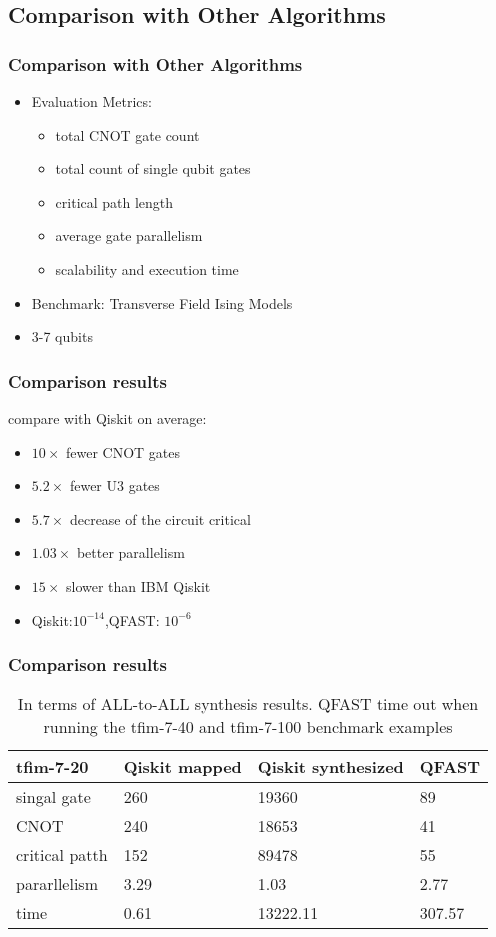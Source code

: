 \documentclass[aspectratio=1610]{beamer}
\begin{document}
\subsection{Comparison with Other Algorithms}
\begin{frame}
\frametitle{Comparison with Other Algorithms}
\begin{itemize}
  \item Evaluation Metrics:
  \begin{itemize}
    \item total CNOT gate count
    \item total count of single qubit gates
    \item critical path length
    \item average gate parallelism
    \item scalability and execution time
  \end{itemize}
  \item Benchmark: Transverse Field Ising Models
  \item 3-7 qubits
\end{itemize}
\end{frame}
\begin{frame}
\frametitle{Comparison results}
compare with Qiskit on average:
\begin{itemize}
  \item $10\times$ fewer CNOT gates
  \item $5.2\times$ fewer U3 gates
  \item $5.7\times$ decrease of the circuit critical
  \item $1.03\times$ better parallelism
  \item $15\times$ slower than IBM Qiskit
  \item Qiskit:$10^{-14}$,QFAST: $10^{-6}$
\end{itemize}
\end{frame}
\begin{frame}
  \frametitle{Comparison results}

  \begin{table}[]
    \begin{tabular}{l|lll}
    tfim-7-20  & Qiskit mapped & Qiskit synthesized & QFAST  \\\hline
    singal gate    & 260           & 19360              & 89     \\
    CNOT           & 240           & 18653              & 41     \\
    critical patth & 152           & 89478              & 55     \\
    pararllelism   & 3.29          & 1.03               & 2.77   \\
    time           & 0.61          & 13222.11           & 307.57
    \end{tabular}
    \caption{In terms of ALL-to-ALL synthesis results. QFAST time out when running the tfim-7-40 and tfim-7-100 benchmark examples}
    \end{table}
\end{frame}
\end{document}
